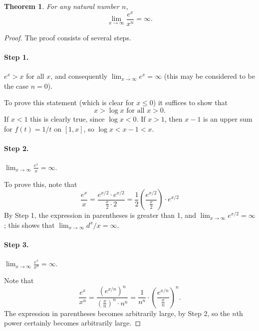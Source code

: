 \documentclass{article}
\numberwithin{corollary}{subsection}
\numberwithin{definition}{subsection}
\numberwithin{lemma}{subsection}
\newtheorem{theorem}{Theorem}
\numberwithin{theorem}{subsection}
\begin{document}
\begin{theorem}
  For any natural number $n$, \[ \lim_{x \to \infty} \frac{e^x}{x^n} = \infty.
  \]
\end{theorem}
\begin{proof}
  The proof consists of several steps.

  \paragraph{Step 1.} $e^x > x$ for all $x$, and consequently
  $\lim_{x \to \infty} e^x = \infty$ (this may be considered to be the case $n
  = 0$).

  To prove this statement (which is clear for $x \leq 0$) it suffices to show
  that \[ x > \log x \text{ for all } x > 0. \] If $x < 1$ this is clearly
  true, since $\log x < 0$. If $x > 1$, then $x - 1$ is an upper sum for $f(t)
  = 1/t$ on $[1, x]$, so $\log x < x - 1 < x$.

  \paragraph{Step 2.} $\lim_{x \to \infty} \frac{e^x}{x} = \infty$.

  To prove this, note that \[
    \frac{e^x}{x}
    = \frac{e^{x/2} \cdot e^{x/2}}{\frac{x}{2} \cdot 2}
    = \frac{1}{2}\left(\frac{e^{x/2}}{\frac{x}{2}}\right) \cdot e^{x/2}
  \] By Step 1, the expression in parentheses is greater than 1, and
  $\lim_{x \to \infty} e^{x/2} = \infty$; this shows that $\lim_{x \to \infty}
  d^x/x = \infty$.

  \paragraph{Step 3.} $\lim_{x \to \infty} \frac{e^x}{x^n} = \infty$.

  Note that \[
    \frac{e^x}{x^n}
    = \frac{(e^{x/n})^n}{\left(\frac{x}{n}\right)^n \cdot n^n}
    = \frac{1}{n^n} \cdot \left(\frac{e^{x/n}}{\frac{x}{n}}\right)^n.
  \] The expression in parentheses becomes arbitrarily large, by Step 2, so the
  $n$th power certainly becomes arbitrarily large.
\end{proof}
\end{document}
